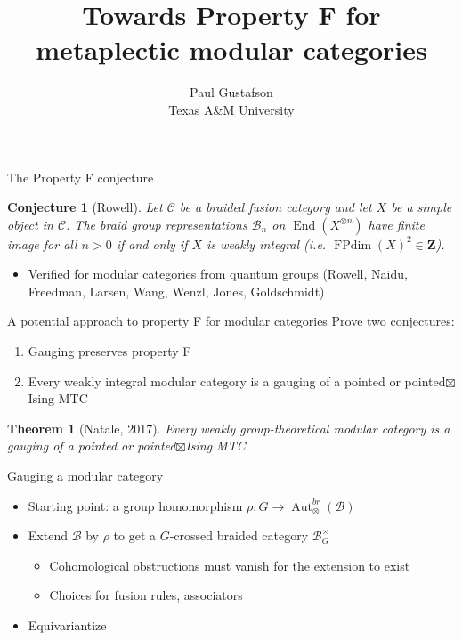 \documentclass{beamer}
\title{Towards Property F for metaplectic modular categories}
\date{Paul Gustafson \\ Texas A\&M University}
\newcommand{\mB}{\mathcal{B}}
\newtheorem{thm}[theorem]{Theorem}
\newtheorem{conj}[theorem]{Conjecture}
\DeclareMathOperator{\FPdim}{FPdim}
\DeclareMathOperator{\Aut}{Aut}
\DeclareMathOperator{\End}{End}
\begin{document}
\frame{\titlepage}


\begin{frame}{The Property F conjecture}
\begin{conj}[Rowell]
Let $\mathcal C$ be a braided fusion category and let $X$ be a simple object in $\mathcal C$.  The braid group representations $\mathcal B_n$ on $\End(X^{\otimes n})$ have finite image for all $n>0$ if and only if  $X$ is weakly integral (i.e. $\FPdim(X)^2 \in \mathbf Z$).
\end{conj}

\begin{itemize}
\item Verified for modular categories from quantum groups (Rowell, Naidu, Freedman, Larsen, Wang, Wenzl, Jones, Goldschmidt) 
\end{itemize}
\end{frame}


\begin{frame}{A potential approach to property F for modular categories}
  Prove two conjectures:
  \begin{enumerate}[(1)]
  \item Gauging preserves property F
  \item Every weakly integral modular category is a gauging of a pointed or pointed$\boxtimes$Ising MTC
  \end{enumerate}

  \pause

  \begin{thm}[Natale, 2017]
    Every weakly group-theoretical modular category is a gauging of a pointed or pointed$\boxtimes$Ising MTC
  \end{thm}
\end{frame}


\begin{frame}{Gauging a modular category}
  \begin{itemize}
  \item Starting point: a group homomorphism $\rho: G \to \Aut_\otimes^{br}(\mB)$
  \item Extend $\mB$ by $\rho$ to get a $G$-crossed braided category $\mB_G^\times$
    \begin{itemize}
    \item Cohomological obstructions must vanish for the extension to exist
    \item Choices for fusion rules, associators 
    \end{itemize}
  \item Equivariantize 
  \end{itemize}
\end{frame}
\end{document}
